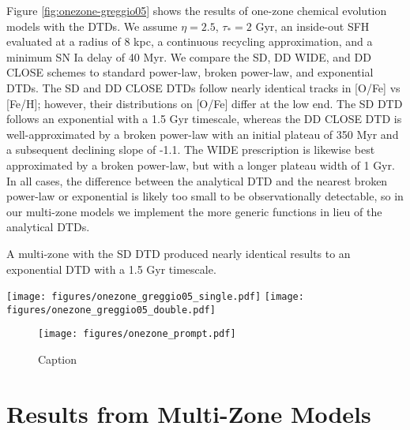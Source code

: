 \documentclass[twocolumn,linenumbers,twocolappendix]{aastex631}
\begin{document}
Figure \ref{fig:onezone-greggio05} shows the results of one-zone chemical evolution models with the \citet{Greggio2005-AnalyticalRates} DTDs. We assume $\eta=2.5$, $\tau_*=2$ Gyr, an inside-out SFH evaluated at a radius of 8 kpc, a continuous recycling approximation, and a minimum SN Ia delay of 40 Myr. We compare the SD, DD WIDE, and DD CLOSE schemes to standard power-law, broken power-law, and exponential DTDs. The SD and DD CLOSE DTDs follow nearly identical tracks in [O/Fe] vs [Fe/H]; however, their distributions on [O/Fe] differ at the low end. The SD DTD follows an exponential with a 1.5 Gyr timescale, whereas the DD CLOSE DTD is well-approximated by a broken power-law with an initial plateau of 350 Myr and a subsequent declining slope of -1.1. The WIDE prescription is likewise best approximated by a broken power-law, but with a longer plateau width of 1 Gyr. In all cases, the difference between the analytical DTD and the nearest broken power-law or exponential is likely too small to be observationally detectable, so in our multi-zone models we implement the more generic functions in lieu of the analytical DTDs.

A multi-zone with the \citet{Greggio2005-AnalyticalRates} SD DTD produced nearly identical results to an exponential DTD with a 1.5 Gyr timescale.

\begin{figure*}
    \centering
    \texttt{[image: figures/onezone\_greggio05\_single.pdf]}
    \texttt{[image: figures/onezone\_greggio05\_double.pdf]}
    \caption{Abundance tracks and distributions from one-zone models with the analytical DTDs from \citet{Greggio2005-AnalyticalRates}. \textit{Left:} a comparison between the analytical SD DTD (solid curve), an exponential DTD with a 1.5 Gyr timescale (dashed curve), and a power-law DTD with a slope of -1.1 (dotted curve). \textit{Right:} a comparison between two different prescriptions for an analytical DD DTD (solid curves), power-law DTDs with an initial plateau of 1 Gyr and 350 Myr (dashed curves), and a power-law DTD with no plateau and a slope of -1.1 (dotted curve).}
    \label{fig:onezone-greggio05}
\end{figure*}

\begin{figure}
    \centering
    \texttt{[image: figures/onezone\_prompt.pdf]}
    \caption{Caption}
    \label{fig:onezone-prompt}
\end{figure}

\section{Results from Multi-Zone Models}
\label{sec:multizone-results}
\end{document}
